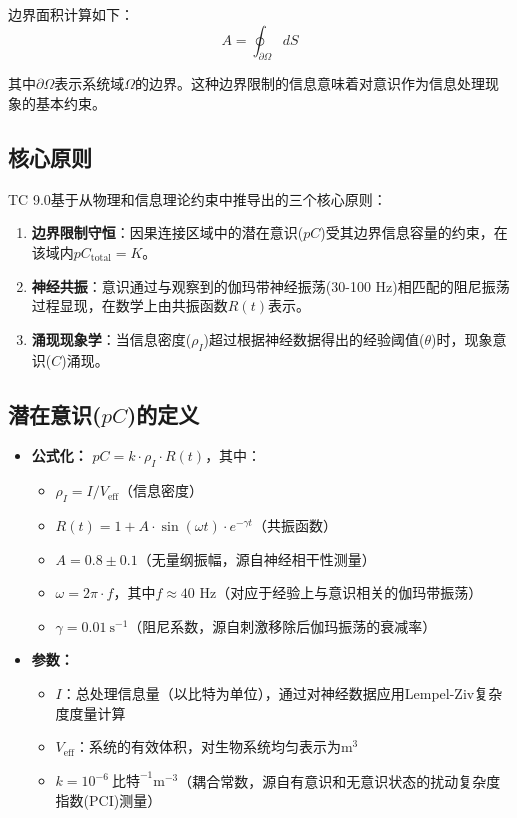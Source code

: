 \documentclass[12pt]{article}
\begin{document}
\begin{CJK}{UTF8}{gbsn}
边界面积计算如下：
\begin{equation}
A = \oint_{\partial \Omega} dS
\end{equation}

其中$\partial \Omega$表示系统域$\Omega$的边界。这种边界限制的信息意味着对意识作为信息处理现象的基本约束。

\subsection{核心原则}
TC 9.0基于从物理和信息理论约束中推导出的三个核心原则：

\begin{enumerate}
    \item \textbf{边界限制守恒}：因果连接区域中的潜在意识($pC$)受其边界信息容量的约束，在该域内$pC_{\text{total}} = K$。
    
    \item \textbf{神经共振}：意识通过与观察到的伽玛带神经振荡(30-100 Hz)相匹配的阻尼振荡过程显现，在数学上由共振函数$R(t)$表示。
    
    \item \textbf{涌现现象学}：当信息密度($\rho_I$)超过根据神经数据得出的经验阈值($\theta$)时，现象意识($C$)涌现。
\end{enumerate}

\subsection{潜在意识($pC$)的定义}
\begin{itemize}
    \item \textbf{公式化：} $pC = k \cdot \rho_I \cdot R(t)$，其中：
    \begin{itemize}
        \item $\rho_I = I / V_{\text{eff}}$（信息密度）
        \item $R(t) = 1 + A \cdot \sin(\omega t) \cdot e^{-\gamma t}$（共振函数）
        \item $A = 0.8 \pm 0.1$（无量纲振幅，源自神经相干性测量\cite{melloni2007}）
        \item $\omega = 2\pi \cdot f$，其中$f \approx 40$ Hz（对应于经验上与意识相关的伽玛带振荡\cite{crick1990,dehaene2011}）
        \item $\gamma = 0.01~\text{s}^{-1}$（阻尼系数，源自刺激移除后伽玛振荡的衰减率\cite{buzsaki2004,fries2015}）
    \end{itemize}
    
    \item \textbf{参数：} 
    \begin{itemize}[label=--]
        \item $I$：总处理信息量（以比特为单位），通过对神经数据应用Lempel-Ziv复杂度度量计算\cite{schartner2015}
        \item $V_{\text{eff}}$：系统的有效体积，对生物系统均匀表示为$\text{m}^3$
        \item $k = 10^{-6}~\text{比特}^{-1}\text{m}^{-3}$（耦合常数，源自有意识和无意识状态的扰动复杂度指数(PCI)测量\cite{casali2013,casarotto2016}）
    \end{itemize}
    

\end{itemize}
\end{CJK}
\end{document}
